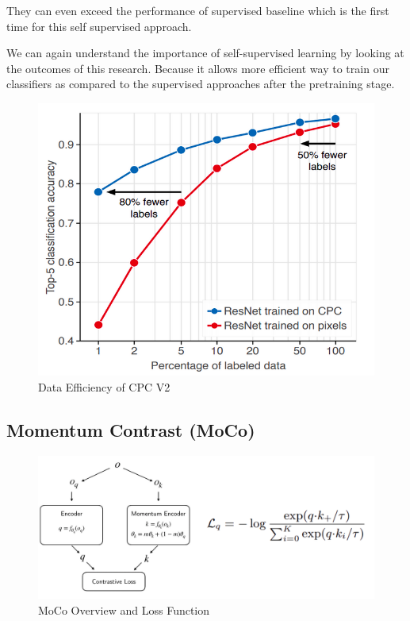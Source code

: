 \documentclass{article}
\begin{document}
They can even exceed the performance of supervised baseline
which is the first time for this self supervised approach.
 
We can again understand the importance of self-supervised learning
by looking at the outcomes of this research. Because it allows
more efficient way to train our classifiers as compared to the
supervised approaches after the pretraining stage.
 
\begin{figure}[H]
   \centering
   \includegraphics[width=0.8\linewidth]{figures/cpcv2_eff.png}
   \caption{Data Efficiency of CPC V2}
   \label{fig:cpc_v2_eff}
\end{figure}
 
 
 
\subsection{Momentum Contrast (MoCo) \cite{he2020momentum}}
 
 
\begin{figure}[H]
   \centering
   \includegraphics[width=0.8\linewidth]{figures/moco.png}
   \caption{MoCo Overview and Loss Function}
   \label{fig:moco}
\end{figure}
 
\end{document}
